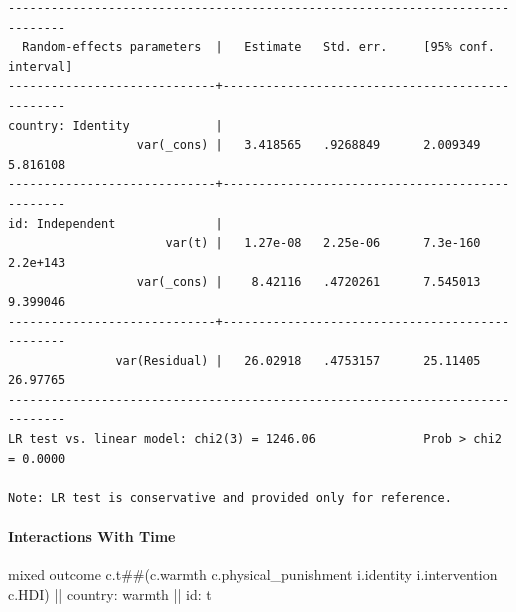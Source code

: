 \documentclass[
  letterpaper,
  DIV=11,
  numbers=noendperiod]{scrreprt}
\let\oldparagraph\paragraph
\renewcommand{\paragraph}[1]{\oldparagraph{#1}\mbox{}}
\newenvironment{Shaded}{\begin{snugshade}}{\end{snugshade}}
\newcommand{\KeywordTok}[1]{\textcolor[rgb]{0.00,0.23,0.31}{#1}}
\newcommand{\NormalTok}[1]{\textcolor[rgb]{0.00,0.23,0.31}{#1}}
\begin{document}
\begin{verbatim}
------------------------------------------------------------------------------
  Random-effects parameters  |   Estimate   Std. err.     [95% conf. interval]
-----------------------------+------------------------------------------------
country: Identity            |
                  var(_cons) |   3.418565   .9268849      2.009349    5.816108
-----------------------------+------------------------------------------------
id: Independent              |
                      var(t) |   1.27e-08   2.25e-06      7.3e-160    2.2e+143
                  var(_cons) |    8.42116   .4720261      7.545013    9.399046
-----------------------------+------------------------------------------------
               var(Residual) |   26.02918   .4753157      25.11405    26.97765
------------------------------------------------------------------------------
LR test vs. linear model: chi2(3) = 1246.06               Prob > chi2 = 0.0000

Note: LR test is conservative and provided only for reference.
\end{verbatim}

\paragraph{Interactions With Time}\label{interactions-with-time}

\begin{Shaded}
\begin{Highlighting}[]
\NormalTok{mixed outcome c.t\#\#(c.warmth c.physical\_punishment i.}\KeywordTok{identity}\NormalTok{ i.intervention c.HDI) || country: warmth || id: t}
\end{Highlighting}
\end{Shaded}
\end{document}
